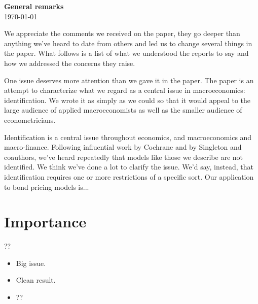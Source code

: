 \documentclass[11pt,letterpaper]{article}
\begin{document}
\bigskipamount
\parindent=0.0in
\thispagestyle{empty}
{\Large\bf General remarks} \\
\today

We appreciate the comments we received on the paper,
they go deeper than anything we've heard to date from others
and led us to change several things in the paper.
What follows is a list of what we understood the reports to say
and how we addressed the concerns they raise.

One issue deserves more attention than we gave it in the paper.
The paper is an attempt to characterize what we regard as a central issue in
macroeconomics:  identification.
We wrote it as simply as we could so that it would appeal to the large audience of applied
macroeconomists as well as the smaller audience of econometricians.

Identification is a central issue throughout economics,
and macroeconomics and macro-finance.
Following influential work by Cochrane and by Singleton and coauthors,
we've heard repeatedly that models like those we describe are not identified.
We think we've done a lot to clarify the issue.
We'd say, instead, that identification requires one or more restrictions
of a specific sort.
Our application to bond pricing models is...



\section*{Importance}

??
\begin{itemize}
\item Big issue.
\item Clean result.
\item ??
\end{itemize}
\end{document}
